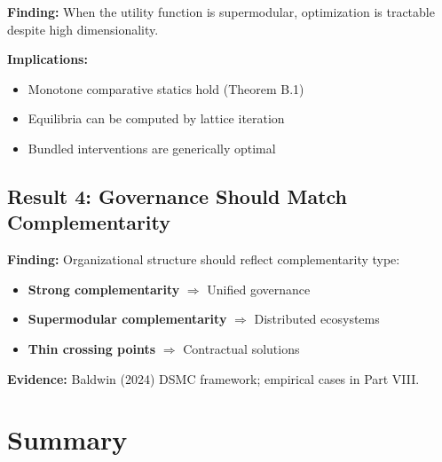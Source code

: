 \begin{tcolorbox}[colback=green!5!white, colframe=green!75!black]
\textbf{Finding:} When the utility function is supermodular, optimization is 
tractable despite high dimensionality.

\textbf{Implications:}
\begin{itemize}[nosep]
    \item Monotone comparative statics hold (Theorem B.1)
    \item Equilibria can be computed by lattice iteration
    \item Bundled interventions are generically optimal
\end{itemize}
\end{tcolorbox}

\subsection{Result 4: Governance Should Match Complementarity}

\begin{tcolorbox}[colback=green!5!white, colframe=green!75!black]
\textbf{Finding:} Organizational structure should reflect complementarity type:
\begin{itemize}[nosep]
    \item \textbf{Strong complementarity} $\Rightarrow$ Unified governance
    \item \textbf{Supermodular complementarity} $\Rightarrow$ Distributed ecosystems
    \item \textbf{Thin crossing points} $\Rightarrow$ Contractual solutions
\end{itemize}

\textbf{Evidence:} Baldwin (2024) DSMC framework; empirical cases in Part VIII.
\end{tcolorbox}



\section{Summary}
\label{sec:B-summary}

